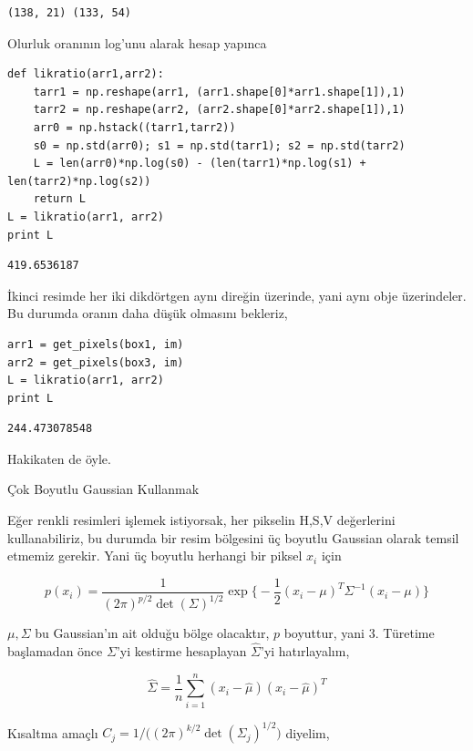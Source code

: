 \documentclass[12pt,fleqn]{article}\usepackage{../../common}
\begin{document}
\begin{verbatim}
(138, 21) (133, 54)
\end{verbatim}

Olurluk oranının log'unu alarak hesap yapınca

\begin{verbatim}
def likratio(arr1,arr2):
    tarr1 = np.reshape(arr1, (arr1.shape[0]*arr1.shape[1]),1)
    tarr2 = np.reshape(arr2, (arr2.shape[0]*arr2.shape[1]),1)
    arr0 = np.hstack((tarr1,tarr2))
    s0 = np.std(arr0); s1 = np.std(tarr1); s2 = np.std(tarr2)
    L = len(arr0)*np.log(s0) - (len(tarr1)*np.log(s1) + len(tarr2)*np.log(s2))
    return L
L = likratio(arr1, arr2)
print L
\end{verbatim}

\begin{verbatim}
419.6536187
\end{verbatim}

İkinci resimde her iki dikdörtgen aynı direğin üzerinde, yani aynı obje
üzerindeler. Bu durumda oranın daha düşük olmasını bekleriz,

\begin{verbatim}
arr1 = get_pixels(box1, im)
arr2 = get_pixels(box3, im)
L = likratio(arr1, arr2)
print L
\end{verbatim}

\begin{verbatim}
244.473078548
\end{verbatim}

Hakikaten de öyle.

Çok Boyutlu Gaussian Kullanmak

Eğer renkli resimleri işlemek istiyorsak, her pikselin H,S,V  değerlerini
kullanabiliriz, bu durumda bir resim bölgesini üç boyutlu Gaussian olarak temsil
etmemiz gerekir. Yani üç boyutlu herhangi bir piksel $x_i$ için

$$
p(x_i) =
\frac{1}{(2\pi)^{p/2} \det(\Sigma)^{1/2}} \exp 
\bigg\{  -\frac{1}{2}(x_i-\mu)^T\Sigma^{-1}(x_i-\mu) \bigg\}
$$

$\mu,\Sigma$ bu Gaussian'ın ait olduğu bölge olacaktır, $p$ boyuttur, yani
3. Türetime başlamadan önce $\Sigma$'yi kestirme hesaplayan $\hat{\Sigma}$'yi
hatırlayalım,

$$ \hat{\Sigma} = \frac{1}{n} \sum_{i=1}^{n} (x_i-\hat{\mu}) (x_i-\hat{\mu})^T $$

Kısaltma amaçlı $C_j = 1 / \big((2\pi)^{k/2} \det(\Sigma_j)^{1/2}\big)$ diyelim, 
\end{document}
